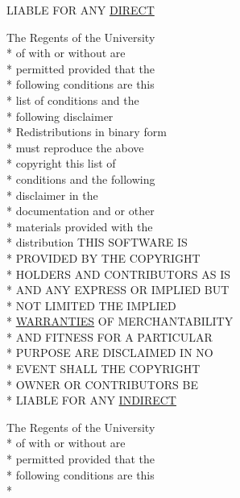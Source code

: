 \begin{DoxyCompactItemize}
L\+I\+A\+B\+L\+E F\+O\+R A\+N\+Y \hyperlink{_l_i_c_e_n_s_e_a0407274df7e8d8cf644f33c63ca8f977}{D\+I\+R\+E\+C\+T}
\item 
The Regents of the University \\*
of with or without are \\*
permitted provided that the \\*
following conditions are this \\*
list of conditions and the \\*
following disclaimer \\*
Redistributions in binary form \\*
must reproduce the above \\*
copyright this list of \\*
conditions and the following \\*
disclaimer in the \\*
documentation and or other \\*
materials provided with the \\*
distribution T\+H\+I\+S S\+O\+F\+T\+W\+A\+R\+E I\+S \\*
P\+R\+O\+V\+I\+D\+E\+D B\+Y T\+H\+E C\+O\+P\+Y\+R\+I\+G\+H\+T \\*
H\+O\+L\+D\+E\+R\+S A\+N\+D C\+O\+N\+T\+R\+I\+B\+U\+T\+O\+R\+S A\+S I\+S \\*
A\+N\+D A\+N\+Y E\+X\+P\+R\+E\+S\+S O\+R I\+M\+P\+L\+I\+E\+D B\+U\+T \\*
N\+O\+T L\+I\+M\+I\+T\+E\+D T\+H\+E I\+M\+P\+L\+I\+E\+D \\*
\hyperlink{_l_i_c_e_n_s_e_a3f8645b457d8bdef4fd7c3549fc01039}{W\+A\+R\+R\+A\+N\+T\+I\+E\+S} O\+F M\+E\+R\+C\+H\+A\+N\+T\+A\+B\+I\+L\+I\+T\+Y \\*
A\+N\+D F\+I\+T\+N\+E\+S\+S F\+O\+R A P\+A\+R\+T\+I\+C\+U\+L\+A\+R \\*
P\+U\+R\+P\+O\+S\+E A\+R\+E D\+I\+S\+C\+L\+A\+I\+M\+E\+D I\+N N\+O \\*
E\+V\+E\+N\+T S\+H\+A\+L\+L T\+H\+E C\+O\+P\+Y\+R\+I\+G\+H\+T \\*
O\+W\+N\+E\+R O\+R C\+O\+N\+T\+R\+I\+B\+U\+T\+O\+R\+S B\+E \\*
L\+I\+A\+B\+L\+E F\+O\+R A\+N\+Y \hyperlink{_l_i_c_e_n_s_e_a2d3578b70dc432980cb5a8bf3002a207}{I\+N\+D\+I\+R\+E\+C\+T}
\item 
The Regents of the University \\*
of with or without are \\*
permitted provided that the \\*
following conditions are this \\*

\end{DoxyCompactItemize}
